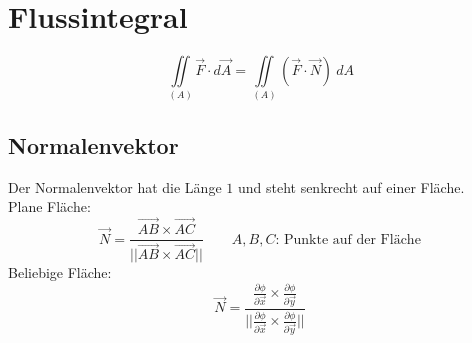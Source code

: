 \section{Flussintegral}
\[ \boxed{\iint\limits_{(A)} \vec{F} \cdot d\vec{A} 
= \iint\limits_{(A)} (\vec{F} \cdot \vec{N}) ~ dA} \]

\subsection{Normalenvektor}
Der Normalenvektor hat die Länge $1$ und steht senkrecht auf einer Fläche. \\
Plane Fläche: 
\[ \boxed{\vec{N} 
= \frac{\overrightarrow{AB} \times \overrightarrow{AC}}
{||\overrightarrow{AB} \times \overrightarrow{AC}||}} 
\qquad \text{$A, B, C$: Punkte auf der Fläche} \]
Beliebige Fläche: 
\[ \boxed{\vec{N} 
= \frac{\frac{\partial \phi}{\partial \vec{x}} 
\times \frac{\partial \phi}{\partial \vec{y}}}
{||\frac{\partial \phi}{\partial \vec{x}} 
\times \frac{\partial \phi}{\partial \vec{y}}||}} \]


